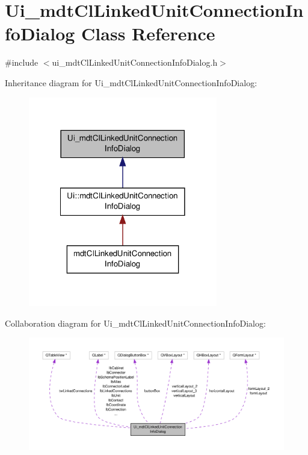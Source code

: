 \hypertarget{class_ui__mdt_cl_linked_unit_connection_info_dialog}{\section{Ui\-\_\-mdt\-Cl\-Linked\-Unit\-Connection\-Info\-Dialog Class Reference}
\label{class_ui__mdt_cl_linked_unit_connection_info_dialog}
}


{\ttfamily \#include $<$ui\-\_\-mdt\-Cl\-Linked\-Unit\-Connection\-Info\-Dialog.\-h$>$}



Inheritance diagram for Ui\-\_\-mdt\-Cl\-Linked\-Unit\-Connection\-Info\-Dialog\-:\nopagebreak
\begin{figure}[H]
\begin{center}
\leavevmode
\includegraphics[width=234pt]{class_ui__mdt_cl_linked_unit_connection_info_dialog__inherit__graph}
\end{center}
\end{figure}


Collaboration diagram for Ui\-\_\-mdt\-Cl\-Linked\-Unit\-Connection\-Info\-Dialog\-:\nopagebreak
\begin{figure}[H]
\begin{center}
\leavevmode
\includegraphics[width=350pt]{class_ui__mdt_cl_linked_unit_connection_info_dialog__coll__graph}
\end{center}
\end{figure}
